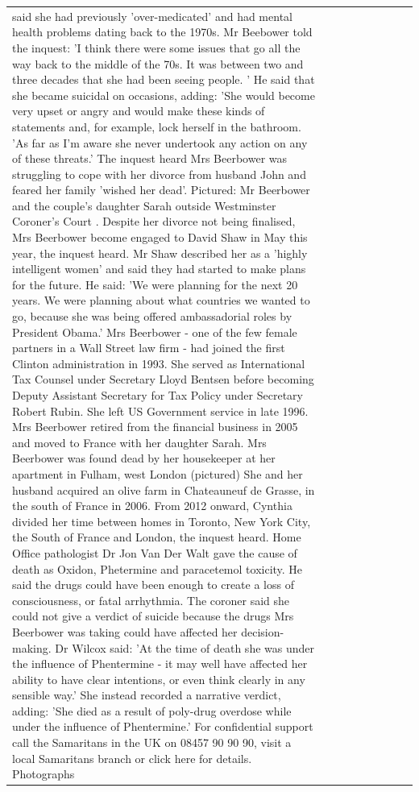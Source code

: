 \begin{table}[H]
\begin{tabular}{lllrlllll}
said she had previously 'over-medicated' and had mental health problems dating back to the 1970s. Mr Beebower told the inquest: 'I think there were some issues that go all the way back to the middle of the 70s. It was between two and three decades that she had been seeing people. ' He said that she became suicidal on occasions, adding: 'She would become very upset or angry and would make these kinds of statements and, for example, lock herself in the bathroom. 'As far as I'm aware she never undertook any action on any of these threats.' The inquest heard Mrs Beerbower was struggling to cope with her divorce from husband John and feared her family 'wished her dead'. Pictured: Mr Beerbower and the couple's daughter Sarah outside Westminster Coroner's Court . Despite her divorce not being finalised, Mrs Beerbower become engaged to David Shaw in May this year, the inquest heard. Mr Shaw described her as a 'highly intelligent women' and said they had started to make plans for the future. He said: 'We were planning for the next 20 years. We were planning about what countries we wanted to go, because she was being offered ambassadorial roles by President Obama.' Mrs Beerbower - one of the few female partners in a Wall Street law firm - had joined the first Clinton administration in 1993. She served as International Tax Counsel under Secretary Lloyd Bentsen before becoming Deputy Assistant Secretary for Tax Policy under Secretary Robert Rubin. She left US Government service in late 1996. Mrs Beerbower retired from the financial business in 2005 and moved to France with her daughter Sarah. Mrs Beerbower was found dead by her housekeeper at her apartment in Fulham, west London (pictured) She and her husband acquired an olive farm in Chateauneuf de Grasse, in the south of France in 2006. From 2012 onward, Cynthia divided her time between homes in Toronto, New York City, the South of France and London, the inquest heard. Home Office pathologist Dr Jon Van Der Walt gave the cause of death as Oxidon, Phetermine and paracetemol toxicity. He said the drugs could have been enough to create a loss of consciousness, or fatal arrhythmia. The coroner said she could not give a verdict of suicide because the drugs Mrs Beerbower was taking could have affected her decision-making. Dr Wilcox said: 'At the time of death she was under the influence of Phentermine - it may well have affected her ability to have clear intentions, or even think clearly in any sensible way.' She instead recorded a narrative verdict, adding: 'She died as a result of poly-drug overdose while under the influence of Phentermine.' For confidential support call the Samaritans in the UK on 08457 90 90 90, visit a local Samaritans branch or click here for details. Photographs \\

\end{tabular}
\end{table}

